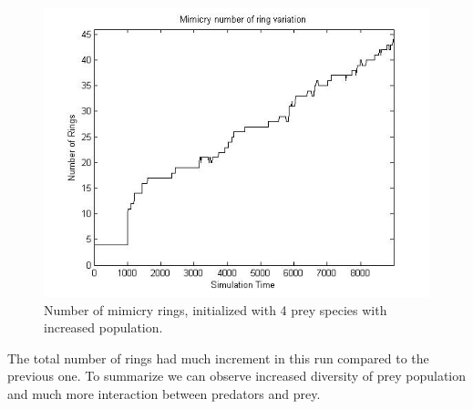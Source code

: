 \begin{figure}[H]
	\centering
	\includegraphics[scale=0.50]{images/ringSize10k-4MorePrey}
	\caption{Number of mimicry rings, initialized with 4 prey species with increased population.}
	\label{fig:ringSize10k-4MorePrey}
\end{figure}

The total number of rings had much increment in this run compared to the previous one. To summarize we can observe increased diversity of prey population and much more interaction between predators and prey.

